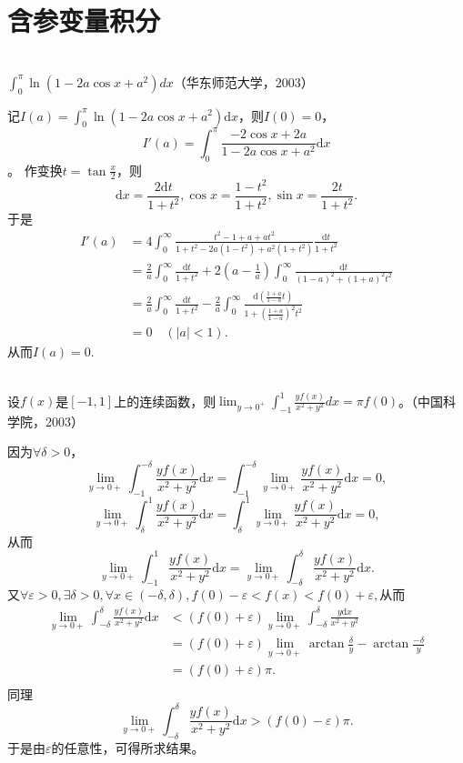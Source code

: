    \section{含参变量积分}
  \begin{exercise}
  \hfill\\
 $\displaystyle\int_0^{\pi}\ln(1-2a\cos x+a^2)dx$（华东师范大学，2003）  
  
   记$I(a)=\int_0^{\pi}\ln(1-2a\cos x+a^2)\mathrm{d}x$，则$I(0)=0$，$$I'(a)=\int_0^{\pi}\frac{-2\cos x+2a}{1-2a\cos x+a^2}\mathrm{d}x$$。
  作变换$t=\tan\frac{x}{2}$，则$$\mathrm{d}x=\frac{2\mathrm{d}t}{1+t^2},\cos x=\frac{1-t^2}{1+t^2},\sin x=\frac{2t}{1+t^2}.$$
  于是
  \begin{align*}
  I'(a)&=4\int_0^{\infty}\frac{t^2-1+a+at^2}{1+t^2-2a(1-t^2)+a^2(1+t^2)}\frac{\mathrm{d}t}{1+t^2}\\
  &=\frac{2}{a}\int_0^{\infty}\frac{\mathrm{d}t}{1+t^2}+2(a-\frac{1}{a})\int_0^{\infty}\frac{\mathrm{d}t}{(1-a)^2+(1+a)^2t^2}\\
  &=\frac{2}{a}\int_0^{\infty}\frac{\mathrm{d}t}{1+t^2}-\frac{2}{a}\int_0^{\infty}\frac{\mathrm{d}(\frac{1+a}{1-a}t)}{1+(\frac{1+a}{1-a})^2t^2}\\
  &=0\quad(|a|<1).
  \end{align*}
  从而$I(a)=0.$
 
  \end{exercise}

  \begin{exercise}
  \hfill\\
   设$f(x)$是$[-1,1]$上的连续函数，则$\displaystyle\lim_{y\rightarrow0^+}\int_{-1}^{1}\frac{yf(x)}{x^2+y^2}dx=\pi f(0)$。（中国科学院，2003） 
  
 因为$\forall\delta>0$，
$$\lim_{y\rightarrow0+}\int_{-1}^{-\delta}\frac{yf(x)}{x^2+y^2}\mathrm{d}x=\int_{-1}^{-\delta}\lim_{y\rightarrow0+}\frac{yf(x)}{x^2+y^2}\mathrm{d}x=0,$$
$$\lim_{y\rightarrow0+}\int^{1}_{\delta}\frac{yf(x)}{x^2+y^2}\mathrm{d}x=\int^{1}_{\delta}\lim_{y\rightarrow0+}\frac{yf(x)}{x^2+y^2}\mathrm{d}x=0,$$
从而
$$\lim_{y\rightarrow0+}\int_{-1}^{1}\frac{yf(x)}{x^2+y^2}\mathrm{d}x=\lim_{y\rightarrow0+}\int_{-\delta}^{\delta}\frac{yf(x)}{x^2+y^2}\mathrm{d}x.$$
又$\forall\varepsilon>0,\exists\delta>0,\forall x\in(-\delta,\delta),f(0)-\varepsilon<f(x)<f(0)+\varepsilon,$从而
\begin{align*}
\lim_{y\rightarrow0+}\int_{-\delta}^{\delta}\frac{yf(x)}{x^2+y^2}\mathrm{d}x&<(f(0)+\varepsilon)\lim_{y\rightarrow0+}\int_{-\delta}^{\delta}\frac{y\mathrm{d}x}{x^2+y^2}\\
&=(f(0)+\varepsilon)\lim_{y\rightarrow0+}\arctan\frac{\delta}{y}-\arctan\frac{-\delta}{y}\\
&=(f(0)+\varepsilon)\pi.\\
\end{align*}
同理$$\lim_{y\rightarrow0+}\int_{-\delta}^{\delta}\frac{yf(x)}{x^2+y^2}\mathrm{d}x>(f(0)-\varepsilon)\pi.$$
于是由$\varepsilon$的任意性，可得所求结果。 
  \end{exercise}


